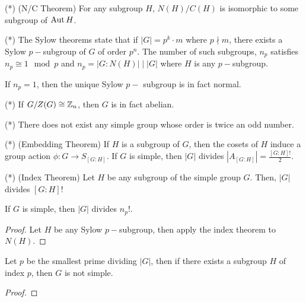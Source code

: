 \documentclass{article}
\begin{document}
\begin{theorem}
(*) (N/C Theorem) For any subgroup $H$, $N(H)/C(H)$ is isomorphic to some subgroup of $\operatorname{Aut} H$.
\end{theorem}

\begin{theorem}
(*) The Sylow theorems state that if $|G|=p^k \cdot m$ where $p \nmid m$, there exists a Sylow $p-$subgroup of $G$ of order $p^n$. The number of such subgroups, $n_p$ satisfies $n_p \cong 1 \mod p$ and $n_p = |G : N(H)| \mid |G|$ where $H$ is any $p-$subgroup.
\end{theorem}
\begin{corollary}
If $n_p = 1$, then the unique Sylow $p-$ subgroup is in fact normal.
\end{corollary}

\begin{theorem}
(*) If $G/Z(G) \cong \mathbb Z_n$, then $G$ is in fact abelian.
\end{theorem}

\begin{theorem}
(*) There does not exist any simple group whose order is twice an odd number.
\end{theorem}

\begin{theorem}
(*) (Embedding Theorem) If $H$ is a subgroup of $G$, then the cosets of $H$ induce a group action $\phi : G \to S_{[G:H]}$. If $G$ is simple, then $|G|$ divides $|A_{[G:H]}| = \frac{[G:H]!}{2}$.
\end{theorem}

\begin{theorem}
(*) (Index Theorem) Let $H$ be any subgroup of the simple group $G$. Then, $|G|$ divides $[G:H]!$    
\end{theorem}

\begin{corollary}
If $G$ is simple, then $|G|$ divides $n_p!$.
\end{corollary}
\begin{proof}
    Let $H$ be any Sylow $p-$subgroup, then apply the index theorem to $N(H)$.
\end{proof}


\begin{proposition}
    Let $p$ be the smallest prime dividing $|G|$, then if there exists a subgroup $H$ of index $p$, then $G$ is not simple.
\end{proposition}
\begin{proof}
    
\end{proof}
\end{document}
